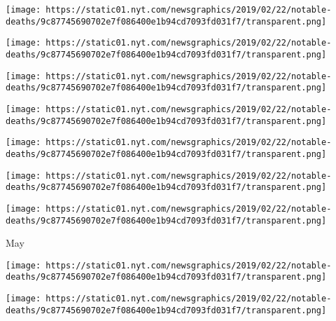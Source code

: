 \texttt{[image: https://static01.nyt.com/newsgraphics/2019/02/22/notable-deaths/9c87745690702e7f086400e1b94cd7093fd031f7/transparent.png]}

\href{https://www.nytimes.com/2019/06/10/obituaries/bushwick-bill-dead.html}{}

\texttt{[image: https://static01.nyt.com/newsgraphics/2019/02/22/notable-deaths/9c87745690702e7f086400e1b94cd7093fd031f7/transparent.png]}

\href{https://www.nytimes.com/2019/06/07/obituaries/maida-heatter-dead.html}{}

\texttt{[image: https://static01.nyt.com/newsgraphics/2019/02/22/notable-deaths/9c87745690702e7f086400e1b94cd7093fd031f7/transparent.png]}

\href{https://www.nytimes.com/2019/06/06/obituaries/dr-john-dies.html}{}

\texttt{[image: https://static01.nyt.com/newsgraphics/2019/02/22/notable-deaths/9c87745690702e7f086400e1b94cd7093fd031f7/transparent.png]}

\href{https://www.nytimes.com/2019/06/04/obituaries/stanley-tigerman-dead.html}{}

\texttt{[image: https://static01.nyt.com/newsgraphics/2019/02/22/notable-deaths/9c87745690702e7f086400e1b94cd7093fd031f7/transparent.png]}

\href{https://www.nytimes.com/2019/06/03/obituaries/donald-fraser-dead.html}{}

\texttt{[image: https://static01.nyt.com/newsgraphics/2019/02/22/notable-deaths/9c87745690702e7f086400e1b94cd7093fd031f7/transparent.png]}

\href{https://www.nytimes.com/2019/06/02/us/leah-chase-died.html}{}

\texttt{[image: https://static01.nyt.com/newsgraphics/2019/02/22/notable-deaths/9c87745690702e7f086400e1b94cd7093fd031f7/transparent.png]}

May

\href{https://www.nytimes.com/2019/05/31/obituaries/frank-lucas-dead.html}{}

\texttt{[image: https://static01.nyt.com/newsgraphics/2019/02/22/notable-deaths/9c87745690702e7f086400e1b94cd7093fd031f7/transparent.png]}

\href{https://www.nytimes.com/2019/05/30/obituaries/leon-redbone-dead.html}{}

\texttt{[image: https://static01.nyt.com/newsgraphics/2019/02/22/notable-deaths/9c87745690702e7f086400e1b94cd7093fd031f7/transparent.png]}

